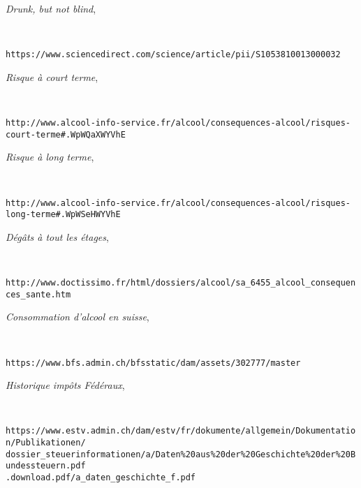 \documentclass[a4paper, french, 12pt]{extarticle}
\begin{document}
	\begin{thebibliography}{9}
		 \emph{Drunk, but not blind}, \begin{scriptsize}\end{scriptsize}\\
		\begin{tiny}\texttt{https://www.sciencedirect.com/science/article/pii/S1053810013000032 }\end{tiny}
		
		 \emph{Risque à court terme}, \begin{scriptsize}[article]\end{scriptsize}\\
		\begin{tiny}\texttt{http://www.alcool-info-service.fr/alcool/consequences-alcool/risques-court-terme\#.WpWQaXWYVhE}\end{tiny}
		
		 \emph{Risque à long terme}, \begin{scriptsize}[article]\end{scriptsize}\\
		\begin{tiny}\texttt{http://www.alcool-info-service.fr/alcool/consequences-alcool/risques-long-terme\#.WpWSeHWYVhE}\end{tiny}
		
		 \emph{Dégâts à tout les étages}, \begin{scriptsize}[article]\end{scriptsize}\\
		\begin{tiny}\texttt{http://www.doctissimo.fr/html/dossiers/alcool/sa\_6455\_alcool\_consequences\_sante.htm} \end{tiny}
		
		 \emph{Consommation d'alcool en suisse}, \begin{scriptsize}[xls]\end{scriptsize}\\
		\begin{tiny}\texttt{https://www.bfs.admin.ch/bfsstatic/dam/assets/302777/master} \end{tiny}
		
		 \emph{Historique impôts Fédéraux}, \begin{scriptsize}[pdf]\end{scriptsize}\\
		\begin{tiny}\texttt{https://www.estv.admin.ch/dam/estv/fr/dokumente/allgemein/Dokumentation/Publikationen/\\dossier\_steuerinformationen/a/Daten\%20aus\%20der\%20Geschichte\%20der\%20Bundessteuern.pdf\\.download.pdf/a\_daten\_geschichte\_f.pdf} \end{tiny}
		
	\end{thebibliography}
\end{document}
